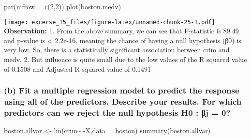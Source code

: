 \documentclass[
]{article}
\newenvironment{Shaded}{\begin{snugshade}}{\end{snugshade}}
\newcommand{\AttributeTok}[1]{\textcolor[rgb]{0.77,0.63,0.00}{#1}}
\newcommand{\DecValTok}[1]{\textcolor[rgb]{0.00,0.00,0.81}{#1}}
\newcommand{\FunctionTok}[1]{\textcolor[rgb]{0.00,0.00,0.00}{#1}}
\newcommand{\NormalTok}[1]{#1}
\newcommand{\OtherTok}[1]{\textcolor[rgb]{0.56,0.35,0.01}{#1}}
\newcommand{\SpecialCharTok}[1]{\textcolor[rgb]{0.00,0.00,0.00}{#1}}
\begin{document}
\begin{Shaded}
\begin{Highlighting}[]
\FunctionTok{par}\NormalTok{(}\AttributeTok{mfrow =} \FunctionTok{c}\NormalTok{(}\DecValTok{2}\NormalTok{,}\DecValTok{2}\NormalTok{))}
\FunctionTok{plot}\NormalTok{(boston.medv)}
\end{Highlighting}
\end{Shaded}

\texttt{[image: excerse\_15\_files/figure-latex/unnamed-chunk-25-1.pdf]}
\textbf{Observation:} 1. From the above summary, we can see that
F-statistic is 89.49 and p-value is \textless{} 2.2e-16, meaning the
chance of having a null hypothesis (β0) is very low. So, there is a
statistically significant association between crim and medv. 2. But
influence is quite small due to the low values of the R squared value of
0.1508 and Adjusted R squared value of 0.1491

\hypertarget{b-fit-a-multiple-regression-model-to-predict-the-response-using-all-of-the-predictors.-describe-your-results.-for-which-predictors-can-we-reject-the-null-hypothesis-h0-ux3b2j-0}{%
\subsubsection{(b) Fit a multiple regression model to predict the
response using all of the predictors. Describe your results. For which
predictors can we reject the null hypothesis H0 : βj =
0?}\label{b-fit-a-multiple-regression-model-to-predict-the-response-using-all-of-the-predictors.-describe-your-results.-for-which-predictors-can-we-reject-the-null-hypothesis-h0-ux3b2j-0}}

\begin{Shaded}
\begin{Highlighting}[]
\NormalTok{boston.allvar }\OtherTok{\textless{}{-}} \FunctionTok{lm}\NormalTok{(crim}\SpecialCharTok{\textasciitilde{}}\NormalTok{.}\SpecialCharTok{{-}}\NormalTok{X,}\AttributeTok{data =}\NormalTok{ boston)}
\FunctionTok{summary}\NormalTok{(boston.allvar)}
\end{Highlighting}
\end{Shaded}
\end{document}
